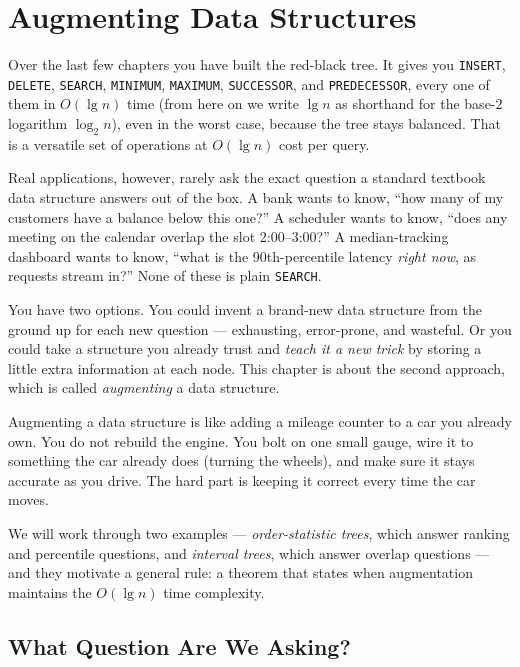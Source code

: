\chapter{Augmenting Data Structures}

Over the last few chapters you have built the red-black tree. It gives you \texttt{INSERT}, \texttt{DELETE}, \texttt{SEARCH},
\texttt{MINIMUM}, \texttt{MAXIMUM}, \texttt{SUCCESSOR}, and
\texttt{PREDECESSOR}, every one of them in $O(\lg n)$ time (from here on we write
$\lg n$ as shorthand for the base-$2$ logarithm $\log_2 n$), even in the worst
case, because the tree stays balanced. That is a versatile set of operations
at $O(\lg n)$ cost per query.

Real applications, however, rarely ask the exact question a standard
textbook data structure answers out of the box. A bank wants to know, ``how many of my
customers have a balance below this one?'' A scheduler wants to know, ``does any
meeting on the calendar overlap the slot 2:00--3:00?'' A median-tracking
dashboard wants to know, ``what is the 90th-percentile latency \emph{right now},
as requests stream in?'' None of these is plain \texttt{SEARCH}.

You have two options. You could invent a brand-new data structure from the
ground up for each new question --- exhausting, error-prone, and wasteful. Or you
could take a structure you already trust and \emph{teach it a new trick} by
storing a little extra information at each node. This chapter is about the
second approach, which is called \emph{augmenting} a data structure.

\begin{intuitionbox}
Augmenting a data structure is like adding a mileage counter to a car you
already own. You do not rebuild the engine. You bolt on one small gauge, wire it
to something the car already does (turning the wheels), and make sure it stays
accurate as you drive. The hard part is keeping it correct every time the car
moves.
\end{intuitionbox}

We will work through two examples --- \emph{order-statistic trees}, which
answer ranking and percentile questions, and \emph{interval trees}, which answer
overlap questions --- and they motivate a general rule: a
theorem that states when augmentation maintains the $O(\lg n)$ time complexity.

\chapterline

\section{What Question Are We Asking?}

